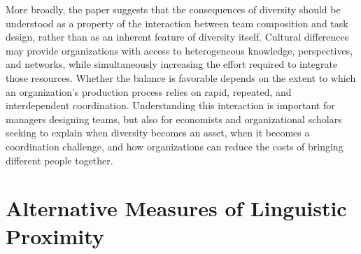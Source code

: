 \documentclass[10pt]{article}
\begin{document}
More broadly, the paper suggests that the consequences of diversity should be understood as a property of the interaction between team composition and task design, rather than as an inherent feature of diversity itself. Cultural differences may provide organizations with access to heterogeneous knowledge, perspectives, and networks, while simultaneously increasing the effort required to integrate those resources. Whether the balance is favorable depends on the extent to which an organization's production process relies on rapid, repeated, and interdependent coordination. Understanding this interaction is important for managers designing teams, but also for economists and organizational scholars seeking to explain when diversity becomes an asset, when it becomes a coordination challenge, and how organizations can reduce the costs of bringing different people together.
\newpage
\appendix
\section{Alternative Measures of Linguistic Proximity}
\label{app:langprox}

\end{document}
